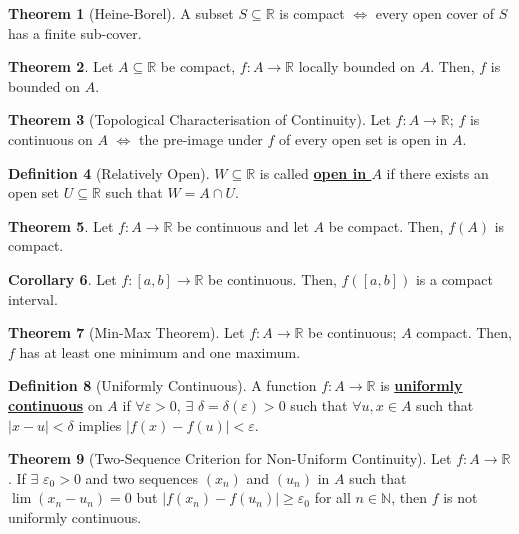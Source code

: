 \documentclass[reqno,11pt]{amsart}
\theoremstyle{definition}
\newtheorem{theorem}{Theorem}
\newtheorem{corollary}[theorem]{Corollary}
\theoremstyle{definition}
\newtheorem{definition}[theorem]{Definition}
\theoremstyle{remark}
\newcommand{\R}{\mathbb{R}}
\newcommand{\N}{\mathbb{N}}
\newcommand{\eps}{\varepsilon}
\newcommand{\dfn}[1]{\underline{\textbf{#1}}}
\begin{document}
\begin{theorem}[Heine-Borel]
	A subset $S \subseteq \R$ is compact $\iff$ every open cover of $S$ has a finite sub-cover.
\end{theorem}

\begin{theorem}
	Let $A \subseteq \R$ be compact, $f: A \rightarrow \R$ locally bounded on $A$. Then, $f$ is bounded on $A$. 
\end{theorem}

\begin{theorem}[Topological Characterisation of Continuity]
	Let $f: A \rightarrow \R$; $f$ is continuous on $A$ $\iff$ the pre-image under $f$ of every open set is open in $A$. 
\end{theorem}

\begin{definition}[Relatively Open]
	$W \subseteq \R$ is called \dfn{open in $A$} if there exists an open set $U \subseteq \R$ such that $W = A \cap U$.
\end{definition}

\begin{theorem}
	Let $f: A \rightarrow \R$ be continuous and let $A$ be compact. Then, $f(A) $ is compact.
\end{theorem}

\begin{corollary}
	Let $f: [a,b] \rightarrow \R$ be continuous. Then, $f([a,b])$ is a compact interval.
\end{corollary}

\begin{theorem}[Min-Max Theorem]
	Let $f: A \rightarrow \R$ be continuous; $A$ compact. Then, $f$ has at least one minimum and one maximum.
\end{theorem}

\begin{definition}[Uniformly Continuous]
	A function $f: A \rightarrow \R$ is \dfn{uniformly continuous} on $A$ if $\forall \eps > 0$, $\exists$ $\delta = \delta(\eps) > 0$ such that $\forall u, x \in A$ such that $|x-u| < \delta$ implies $|f(x) - f(u)| < \eps$.
\end{definition}

\begin{theorem}[Two-Sequence Criterion for Non-Uniform Continuity] 
	Let $f: A \rightarrow \R$. If $\exists$ $\eps_0 > 0$ and two sequences $(x_n)$ and $(u_n)$ in $A$ such that $\lim(x_n - u_n) = 0$ but $|f(x_n) - f(u_n)| \geq \eps_0$ for all $n \in \N$, then $f$ is not uniformly continuous. 
\end{theorem}
\end{document}
